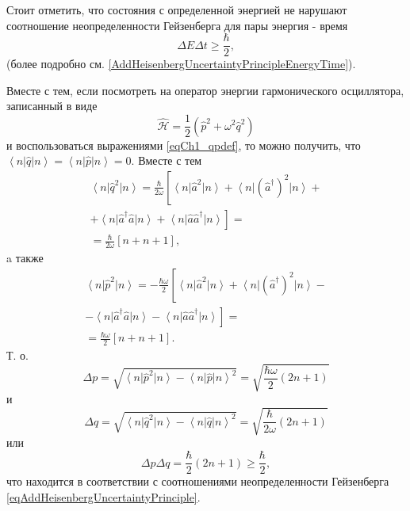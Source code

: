 \begin{remark}
  Стоит отметить, что состояния с определенной энергией не нарушают 
  соотношение неопределенности Гейзенберга для пары
  энергия - время
  \[
  \Delta E \Delta t \ge \frac{\hbar}{2},
  \]
  (более подробно
  см. \autoref{AddHeisenbergUncertaintyPrincipleEnergyTime}). 

  Вместе с тем, если посмотреть на оператор энергии гармонического
  осциллятора, записанный в виде
  \[
  \hat{\mathcal{H}} =\frac{1}{2} \left(\hat{p}^2 +
  \omega^2\hat{q}^2\right)
  \]
  и воспользоваться выражениями \eqref{eqCh1_qpdef}, то можно получить,
  что $\left<n\right|\hat{q}\left|n\right> =
  \left<n\right|\hat{p}\left|n\right> = 0$. Вместе с тем
  \begin{eqnarray}
    \left<n\right|\hat{q}^2\left|n\right> = \frac{\hbar}{2 \omega}
    \left[
      \left<n\right|\hat{a}^2\left|n\right> +
      \left<n\right|\left(\hat{a}^{\dag}\right)^2\left|n\right> +
      \right.
      \nonumber \\
      \left.
      +
      \left<n\right|\hat{a}^{\dag}\hat{a}\left|n\right> +
      \left<n\right|\hat{a}\hat{a}^{\dag}\left|n\right>
      \right] =
    \nonumber \\
    = \frac{\hbar}{2 \omega}
    \left[n + n + 1\right],
    \nonumber
  \end{eqnarray}
  a также
  \begin{eqnarray}
    \left<n\right|\hat{p}^2\left|n\right> = - \frac{\hbar \omega}{2}
    \left[
      \left<n\right|\hat{a}^2\left|n\right> +
      \left<n\right|\left(\hat{a}^{\dag}\right)^2\left|n\right> - \right.
      \nonumber \\
      \left.
      -
      \left<n\right|\hat{a}^{\dag}\hat{a}\left|n\right> -
      \left<n\right|\hat{a}\hat{a}^{\dag}\left|n\right>
      \right] =
    \nonumber \\
    = \frac{\hbar \omega}{2}
    \left[n + n + 1\right].
    \nonumber
  \end{eqnarray}
  Т. о.
  \[
  \Delta p = \sqrt{\left<n\right|\hat{p}^2\left|n\right> -
    \left<n\right|\hat{p}\left|n\right>^2} =
  \sqrt{\frac{\hbar \omega}{2}\left(2n + 1\right)}
  \]
  и
  \[
  \Delta q = \sqrt{\left<n\right|\hat{q}^2\left|n\right> -
    \left<n\right|\hat{q}\left|n\right>^2} =
  \sqrt{\frac{\hbar}{2\omega}\left(2n + 1\right)}
  \]
  или
  \[
  \Delta p \Delta q = \frac{\hbar}{2}\left(2n + 1\right) \ge \frac{\hbar}{2},
  \]
  что находится в соответствии с соотношениями неопределенности
  Гейзенберга \eqref{eqAddHeisenbergUncertaintyPrinciple}.


\end{remark}
